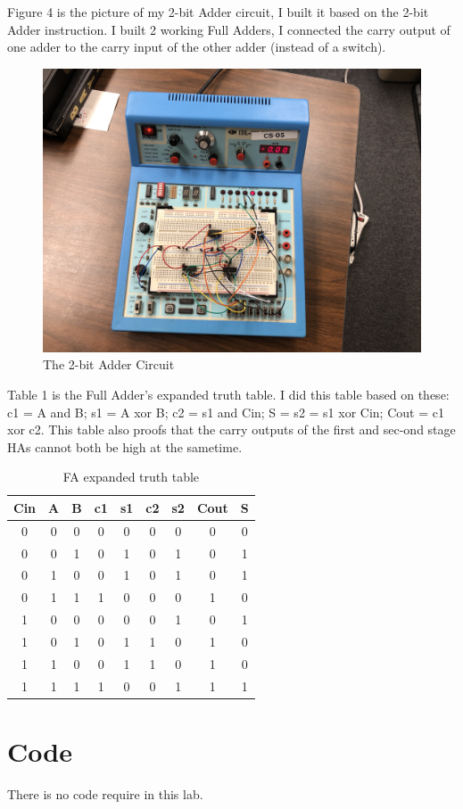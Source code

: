 \documentclass[11pt]{article}
\begin{document}
	 Figure 4 is the picture of my 2-bit Adder circuit, I built it based on the 2-bit Adder instruction. I built 2 working Full Adders, I connected the carry output of one adder to the carry input of the other adder (instead of a switch).\\
	\begin{figure}[ht]\centering
		\includegraphics[width=1.0\textwidth,trim=30cm 10cm 40cm 40cm,clip]{2-bitAdder}
		\caption{The 2-bit Adder Circuit}
		\label{fig:2-bitAdder}
	\end{figure}
	
	Table 1 is the Full Adder's expanded truth table. I did this table based on these: c1 = A and B; s1 = A xor B; c2 = s1 and Cin; S = s2 = s1 xor Cin; Cout = c1 xor c2. This table also proofs that the carry outputs of the first and sec-ond stage HAs cannot both be high at the sametime.\\
	\begin{table}[ht]\centering
		\caption{FA expanded truth table}
		\label{tbl:FA expanded truth table}
		\begin{tabular}{ccc|cccc|cc}
			\toprule
			Cin & A & B & c1 & s1 & c2 & s2 & Cout & S \\
			\midrule
			0 & 0 & 0 & 0 & 0 & 0 & 0 & 0 & 0 \\
			0 & 0 & 1 & 0 & 1 & 0 & 1 & 0 & 1 \\
			0 & 1 & 0 & 0 & 1 & 0 & 1 & 0 & 1 \\
			0 & 1 & 1 & 1 & 0 & 0 & 0 & 1 & 0 \\
			\midrule
			1 & 0 & 0 & 0 & 0 & 0 & 1 & 0 & 1 \\
			1 & 0 & 1 & 0 & 1 & 1 & 0 & 1 & 0 \\
			1 & 1 & 0 & 0 & 1 & 1 & 0 & 1 & 0 \\
			1 & 1 & 1 & 1 & 0 & 0 & 1 & 1 & 1 \\
			\bottomrule
		\end{tabular}
	\end{table}
	
	
	
	\section*{Code}
	
	There is no code require in this lab.\\	
	
	
		
\end{document}
